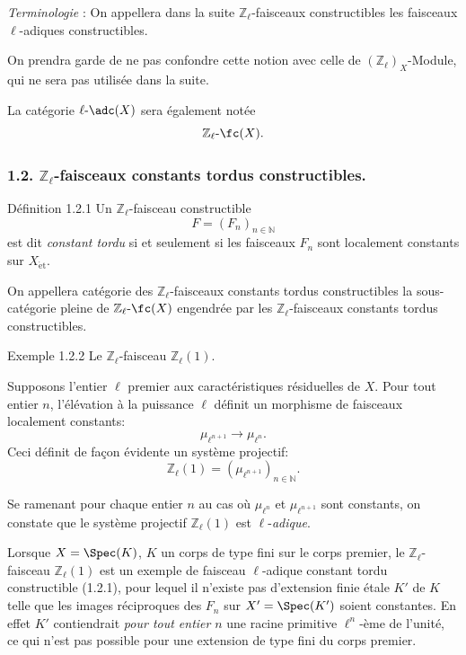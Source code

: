 \emph{Terminologie} : On appellera dans la suite \(\mathbb{Z}_\ell\)-faisceaux constructibles les faisceaux \(\ell\)-adiques constructibles.

On prendra garde de ne pas confondre cette notion avec celle de \((\mathbb{Z}_\ell)_X\)-Module, qui ne sera pas utilisée dans la suite.

La catégorie \(\ell\text{-}\adc(X)\) sera également notée
\[
\mathbb{Z}_\ell\text{-}\fc(X).
\]

\subsubsection*{1.2. \(\mathbb{Z}_\ell\)-faisceaux constants tordus constructibles.}

\begin{statement}{Définition 1.2.1}
Un \(\mathbb{Z}_\ell\)-faisceau constructible
\[
F=(F_n)_{n\in\mathbb{N}}
\]
est dit \emph{constant tordu} si et seulement si les faisceaux \(F_n\) sont localement constants sur \(X_{\mathrm{\acute et}}\).
\end{statement}

On appellera catégorie des \(\mathbb{Z}_\ell\)-faisceaux constants tordus constructibles la sous-catégorie pleine de \(\mathbb{Z}_\ell\text{-}\fc(X)\) engendrée par les \(\mathbb{Z}_\ell\)-faisceaux constants tordus constructibles.

\begin{statement}{Exemple 1.2.2}
Le \(\mathbb{Z}_\ell\)-faisceau \(\mathbb{Z}_\ell(1)\).
\end{statement}

Supposons l'entier \(\ell\) premier aux caractéristiques résiduelles de \(X\). Pour tout entier \(n\), l'élévation à la puissance \(\ell\) définit un morphisme de
faisceaux localement constants:
\[
\mu_{\ell^{n+1}}\longrightarrow \mu_{\ell^n}.
\]
Ceci définit de façon évidente un système projectif:
\[
\mathbb{Z}_\ell(1)=(\mu_{\ell^{n+1}})_{n\in\mathbb{N}}.
\]

Se ramenant pour chaque entier \(n\) au cas où \(\mu_{\ell^n}\) et \(\mu_{\ell^{n+1}}\) sont constants, on constate que le système projectif \(\mathbb{Z}_\ell(1)\) est \(\ell\)-\emph{adique}.

Lorsque \(X=\Spec(K)\), \(K\) un corps de type fini sur le corps premier, le \(\mathbb{Z}_\ell\)-faisceau \(\mathbb{Z}_\ell(1)\) est un exemple de faisceau \(\ell\)-adique constant tordu constructible (1.2.1), pour lequel il n'existe pas d'extension finie étale \(K'\) de \(K\) telle que les images réciproques des \(F_n\) sur \(X'=\Spec(K')\) soient constantes. En effet \(K'\) contiendrait \emph{pour tout entier} \(n\) une racine primitive \(\ell^n\)-ème de l'unité, ce qui n'est pas possible pour une extension de type fini du corps premier.

